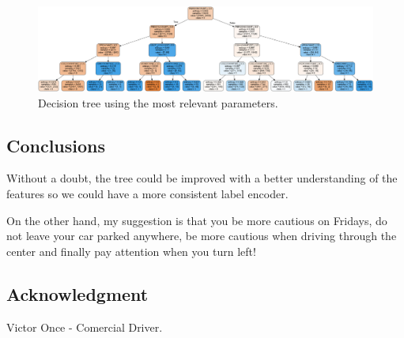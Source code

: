\documentclass[12pt]{article}
\begin{document}
  \begin{figure}[htbp]
    \centering
      \includegraphics[width=1.5\textwidth, height=0.63\textwidth, angle=90]{../images/tree1.png}
    \caption{Decision tree using the most relevant parameters.}
    \label{fig:tree}
  \end{figure}

  \subsection*{Conclusions}

  Without a doubt, the tree could be improved with a better understanding of the features so we could have a more consistent label encoder.

   On the other hand, my suggestion is that you be more cautious on Fridays, do not leave your car parked anywhere, be more cautious when driving through the center and finally pay attention when you turn left!

  \subsection*{Acknowledgment}
  Victor Once - Comercial Driver. 
\end{document}
